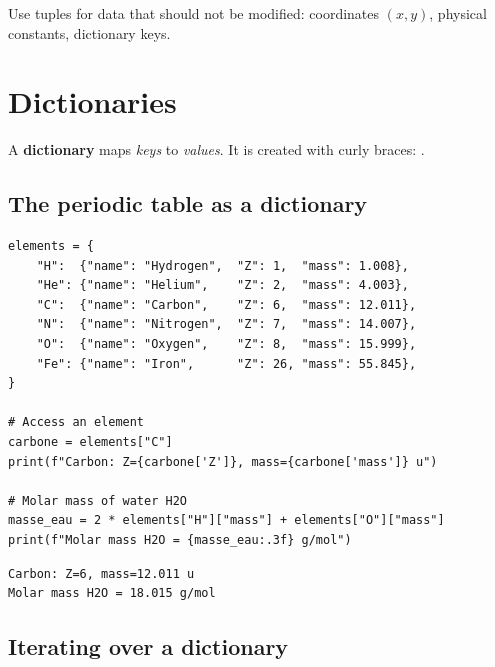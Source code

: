 \begin{remark}
Use tuples for data that should not be modified:
coordinates $(x, y)$, physical constants, dictionary keys.
\end{remark}

\section{Dictionaries}

\begin{definition}[Dictionary]
A \textbf{dictionary} maps \emph{keys} to \emph{values}.
It is created with curly braces: .
\end{definition}

\subsection{The periodic table as a dictionary}

\begin{codeblock}[title=\textbf{Python}]
\begin{verbatim}
elements = {
    "H":  {"name": "Hydrogen",  "Z": 1,  "mass": 1.008},
    "He": {"name": "Helium",    "Z": 2,  "mass": 4.003},
    "C":  {"name": "Carbon",    "Z": 6,  "mass": 12.011},
    "N":  {"name": "Nitrogen",  "Z": 7,  "mass": 14.007},
    "O":  {"name": "Oxygen",    "Z": 8,  "mass": 15.999},
    "Fe": {"name": "Iron",      "Z": 26, "mass": 55.845},
}

# Access an element
carbone = elements["C"]
print(f"Carbon: Z={carbone['Z']}, mass={carbone['mass']} u")

# Molar mass of water H2O
masse_eau = 2 * elements["H"]["mass"] + elements["O"]["mass"]
print(f"Molar mass H2O = {masse_eau:.3f} g/mol")
\end{verbatim}
\end{codeblock}

\begin{codeoutput}
\begin{verbatim}
Carbon: Z=6, mass=12.011 u
Molar mass H2O = 18.015 g/mol
\end{verbatim}
\end{codeoutput}

\subsection{Iterating over a dictionary}

